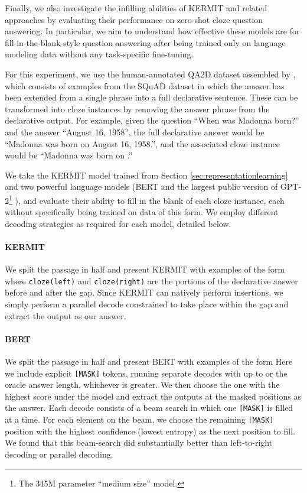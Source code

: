 \documentclass{article}
\begin{document}
Finally, we also investigate the infilling abilities of KERMIT and related approaches by evaluating their performance on zero-shot cloze question answering. In particular, we aim to understand how effective these models are for fill-in-the-blank-style question answering after being trained only on language modeling data without any task-specific fine-tuning.

For this experiment, we use the human-annotated QA2D dataset assembled by \citet{demszky-arxiv-2018}, which consists of examples from the SQuAD dataset \citep{rajpurkar-emnlp-2016} in which the answer has been extended from a single phrase into a full declarative sentence. These can be transformed into cloze instances by removing the answer phrase from the declarative output. For example, given the question ``When was Madonna born?'' and the answer ``August 16, 1958'', the full declarative answer would be ``Madonna was born on August 16, 1958.'', and the associated cloze instance would be ``Madonna was born on  .''

We take the KERMIT model trained from Section \ref{sec:representationlearning} and two powerful language models (BERT \citep{devlin-naacl-2019} and the largest public version of GPT-2\footnote{The 345M parameter ``medium size'' model.} \citep{radford-openai-2019}), and evaluate their ability to fill in the blank of each cloze instance, each without specifically being trained on data of this form. We employ different decoding strategies as required for each model, detailed below.

\paragraph{KERMIT} We split the passage in half and present KERMIT with examples of the form  where \texttt{\small cloze(left)} and \texttt{\small cloze(right)} are the portions of the declarative answer before and after the gap. Since KERMIT can natively perform insertions, we simply perform a parallel decode constrained to take place within the gap and extract the output as our answer.

\paragraph{BERT} We split the passage in half and present BERT with examples of the form  Here we include explicit \texttt{\scriptsize[MASK]} tokens, running separate decodes with  up to  or the oracle answer length, whichever is greater. We then choose the one with the highest score under the model and extract the outputs at the masked positions as the answer. Each decode consists of a beam search in which one \texttt{\small [MASK]} is filled at a time. For each element on the beam, we choose the remaining \texttt{\small [MASK]} position with the highest confidence (lowest entropy) as the next position to fill. We found that this beam-search did substantially better than left-to-right decoding or parallel decoding.
\end{document}
